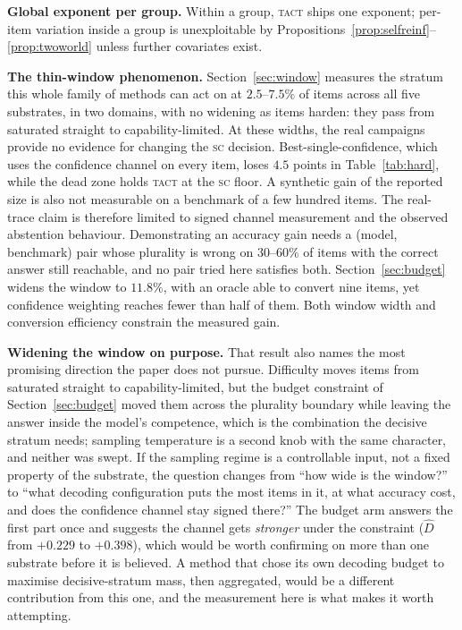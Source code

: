 \documentclass{article}
\newcommand{\Dhat}{\widehat{D}}
\newcommand{\SC}{\textsc{sc}}
\newcommand{\TACT}{\textsc{tact}}
\begin{document}
\textbf{Global exponent per group.} Within a group, \TACT{} ships one exponent; per-item variation inside a group is unexploitable by Propositions~\ref{prop:selfreinf}--\ref{prop:twoworld} unless further covariates exist.

\textbf{The thin-window phenomenon.} Section~\ref{sec:window} measures the stratum this
whole family of methods can act on at $2.5$--$7.5\%$ of items across all five
substrates, in two domains, with no widening as items harden: they pass from
saturated straight to capability-limited. At these widths, the real campaigns
provide no evidence for changing the \SC{} decision. Best-single-confidence,
which uses the confidence channel on every item, loses $4.5$ points in Table~\ref{tab:hard},
while the dead zone holds \TACT{} at the \SC{} floor. A synthetic gain of the
reported size is also not measurable on a benchmark of a few hundred items.
The real-trace claim is therefore limited to signed channel measurement and
the observed abstention behaviour. Demonstrating an accuracy gain needs a (model, benchmark)
pair whose plurality is wrong on $30$--$60\%$ of items with the correct answer
still reachable, and no pair tried here satisfies both.
Section~\ref{sec:budget} widens the window to $11.8\%$, with an oracle able to
convert nine items, yet confidence weighting reaches fewer than half of them.
Both window width and conversion efficiency constrain the measured gain.

\textbf{Widening the window on purpose.} That result also names the most
promising direction the paper does not pursue. Difficulty moves items from
saturated straight to capability-limited, but the budget constraint of
Section~\ref{sec:budget} moved them across the plurality boundary while leaving
the answer inside the model's competence, which is the combination the decisive
stratum needs; sampling temperature is a second knob with the same character,
and neither was swept. If the sampling regime is a controllable input, not a fixed property
of the substrate, the question changes from ``how wide is
the window?'' to ``what decoding configuration puts the most items in it, at
what accuracy cost, and does the confidence channel stay signed there?'' The
budget arm answers the first part once and suggests the channel gets
\emph{stronger} under the constraint ($\Dhat$ from $+0.229$ to $+0.398$), which
would be worth confirming on more than one substrate before it is believed. A
method that chose its own decoding budget to maximise decisive-stratum mass,
then aggregated, would be a different contribution from this one, and the
measurement here is what makes it worth attempting.
\end{document}
